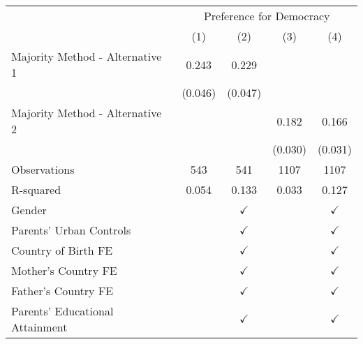 \documentclass[]{article}
\begin{document}
\begin{tabular}{l*{4}{c}}
\hline\hline
                &\multicolumn{4}{c}{Preference for Democracy}\\\cmidrule(lr){2-5}
                &\multicolumn{1}{c}{(1)}&\multicolumn{1}{c}{(2)}&\multicolumn{1}{c}{(3)}&\multicolumn{1}{c}{(4)}\\
\hline
Majority Method - Alternative 1&    0.243&    0.229&         &         \\
                &  (0.046)&  (0.047)&         &         \\
[1em]
Majority Method - Alternative 2&         &         &    0.182&    0.166\\
                &         &         &  (0.030)&  (0.031)\\
\hline
Observations    &  543&  541& 1107& 1107\\
R-squared       &    0.054&    0.133&    0.033&    0.127\\
\hline
Gender          &         &$\checkmark$&         &$\checkmark$\\
Parents' Urban Controls&         &$\checkmark$&         &$\checkmark$\\
Country of Birth FE&         &$\checkmark$&         &$\checkmark$\\
Mother's Country FE&         &$\checkmark$&         &$\checkmark$\\
Father's Country FE&         &$\checkmark$&         &$\checkmark$\\
Parents' Educational Attainment&         &$\checkmark$&         &$\checkmark$\\
\hline\hline
\end{tabular}
\\
\end{document}
